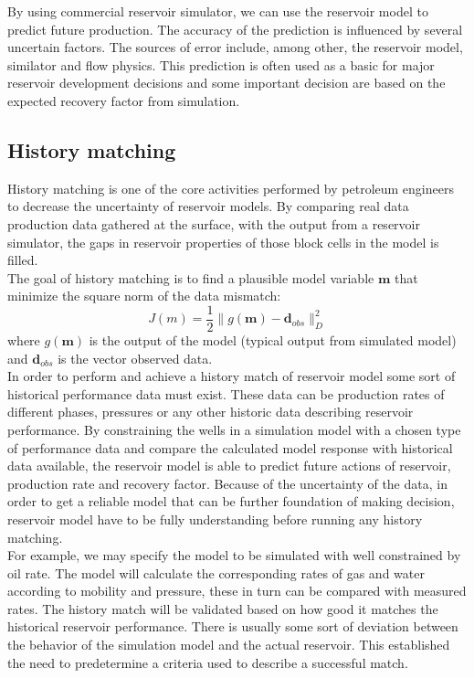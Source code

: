 \documentclass[12pt,a4paper]{report}
\begin{document}
By using commercial reservoir simulator, we can use the reservoir model to predict future production. The accuracy of the prediction is influenced by several uncertain factors. The sources of error include, among other, the reservoir model, similator and flow physics. This prediction is often used as a basic for major reservoir development decisions and some important decision are based on the expected recovery factor from simulation.
\subsection{History matching}
History matching is one of the core activities performed by petroleum engineers to decrease the uncertainty of reservoir models. By comparing real data production data gathered at the surface, with the output from a reservoir simulator, the gaps in reservoir properties of those block cells in the model is filled.\\
The goal of history matching is to find a plausible model variable $\textbf{m}$ that minimize the square norm of the data mismatch:
\begin{equation}
J(m) = \frac{1}{2} \parallel g(\textbf{m}) - \textbf{d}_{obs}\parallel _{D} ^{2}
\end{equation}
where $g(\textbf{m})$ is the output of the model (typical output from simulated model) and $\textbf{d}_{obs}$ is the vector observed data.\\
In order to perform and achieve a history match of reservoir model some sort of historical performance data must exist. These data can be production rates of different phases, pressures or any other historic data describing reservoir performance. By constraining the wells in a simulation model with a chosen type of performance data and compare the calculated model response with historical data available, the reservoir model is able to predict future actions of reservoir, production rate and recovery factor.  Because of the uncertainty of the data, in order to get a reliable model that can be further foundation of making decision, reservoir model have to be fully understanding before running any history matching.\\
For example, we may specify the model to be simulated with well constrained by oil rate. The model will calculate the corresponding rates of gas and water according to mobility and pressure, these in turn can be compared with measured rates. The history match will be validated based on how good it matches the historical reservoir performance. There is usually some sort of deviation between the behavior of the simulation model and the actual reservoir. This established the need to predetermine a criteria used to describe a successful match.\\
\end{document}
